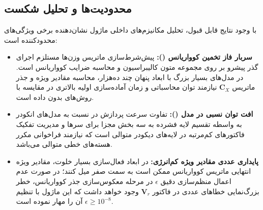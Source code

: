 \subsection{محدودیت‌ها و تحلیل شکست}
با وجود نتایج قابل قبول، تحلیل مکانیزم‌های داخلی ماژول نشان‌دهنده برخی ویژگی‌های محدودکننده است:
\begin{itemize}
    \item \textbf{سربار فاز تخمین کوواریانس ():} پیش‌شرط‌سازی ماتریس وزن‌ها مستلزم اجرای گذر پیشرو بر روی مجموعه متون کالیبراسیون و محاسبه ضرایب کوواریانس است. در مدل‌های بسیار بزرگ با ابعاد پنهان چند ده‌هزار، محاسبه مقادیر ویژه و جذر ماتریس $\mathbf{C}_X$ نیازمند توان محاسباتی و زمان آماده‌سازی اولیه بالاتری در مقایسه با روش‌های بدون داده است.
    \item \textbf{افت توان نسبی در مدل  ():} تفاوت سرعت پردازش در  نسبت به مدل‌های انکودر به واسطه تقسیم لایه فشرده  به سه بخش مجزا برای سرها و مدیریت تفکیک فاکتورهای کم‌مرتبه در لایه‌های دیکودر متوالی است که نیازمند فراخوانی مکرر هسته‌های خطی متوالی می‌باشد.
    \item \textbf{پایداری عددی مقادیر ویژه کم‌انرژی:} در ابعاد فعال‌سازی بسیار خلوت، مقادیر ویژه انتهایی ماتریس کوواریانس ممکن است به سمت صفر میل کنند؛ در صورت عدم اعمال منظم‌سازی دقیق $\epsilon$ در مرحله معکوس‌سازی جذر کوواریانس، خطر بزرگ‌نمایی خطاهای عددی در فاکتور $\mathbf{V}_r$ وجود خواهد داشت که این ماژول با تنظیم $\epsilon \ge 10^{-8}$ آن را مهار نموده است.
\end{itemize}
